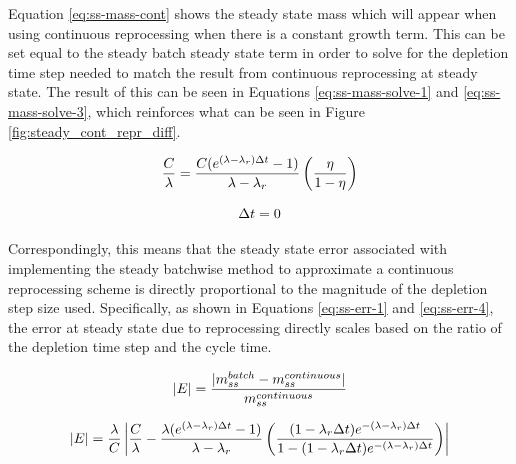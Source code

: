 Equation \eqref{eq:ss-mass-cont} shows the steady state mass which will appear when using continuous reprocessing when there is a constant growth term. This can be set equal to the steady batch steady state term in order to solve for the depletion time step needed to match the result from continuous reprocessing at steady state. The result of this can be seen in Equations \eqref{eq:ss-mass-solve-1} and \eqref{eq:ss-mass-solve-3}, which reinforces what can be seen in Figure \ref{fig:steady_cont_repr_diff}.

\begin{equation} \hfill 
\frac{C}{\lambda} = \frac{C (e^{(\lambda - \lambda_r) \Delta t} - 1)}{\lambda - \lambda_r}  \left( \frac{\eta}{1 - \eta} \right)
\hfill\label{eq:ss-mass-solve-1} \end{equation}

\begin{equation} \hfill 
\Delta t = 0
\hfill\label{eq:ss-mass-solve-3} \end{equation}

Correspondingly, this means that the steady state error associated with implementing the steady batchwise method to approximate a continuous reprocessing scheme is directly proportional to the magnitude of the depletion step size used. Specifically, as shown in Equations \eqref{eq:ss-err-1} and \eqref{eq:ss-err-4}, the error at steady state due to reprocessing directly scales based on the ratio of the depletion time step and the cycle time.

\begin{equation} \hfill 
|E| = \frac{|m_{ss}^{batch} - m_{ss}^{continuous}|}{m_{ss}^{continuous}}
\hfill\label{eq:ss-err-1} \end{equation}



\begin{equation} \hfill 
|E| = \frac{\lambda}{C} \left| \frac{C}{\lambda}  - \frac{\lambda (e^{(\lambda - \lambda_r) \Delta t} - 1)}{\lambda - \lambda_r}  \left( \frac{(1 - \lambda_r \Delta t) e^{-(\lambda - \lambda_r) \Delta t}}{1 - (1 - \lambda_r \Delta t) e^{-(\lambda - \lambda_r) \Delta t}} \right) \right|
\hfill\label{eq:ss-err-4} \end{equation}

